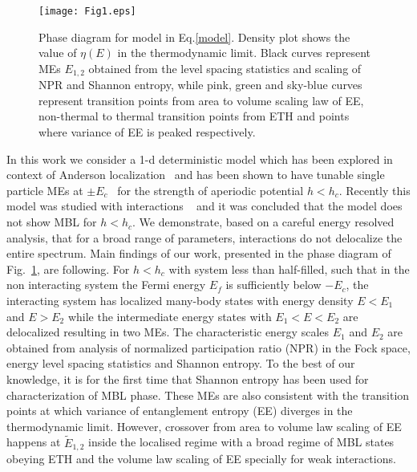 \documentclass[prl,aps,twocolumn,floats,nofootinbib,showpacs]{revtex4}
\begin{document}
\begin{figure}[h!]
\begin{center}
\vskip-0.35cm
\texttt{[image: Fig1.eps]}
\vskip-0.4cm
\caption{Phase diagram for model in Eq.\ref{model}. Density plot shows the value of $\eta(E)$ in the thermodynamic limit. Black curves represent MEs $E_{1,2}$ obtained from the level spacing statistics and scaling of NPR and Shannon entropy, while pink, green and sky-blue curves represent transition points from area to volume scaling law of EE, non-thermal to thermal transition points from ETH and points where variance of EE is peaked respectively.} 
\label{pd}
\end{center}
\end{figure}

In this work we consider a 1-d deterministic model which has been explored in context of Anderson localization~\cite{Fishman} and has been shown to have tunable single particle MEs at $\pm E_c$~\cite{Sarma1990} for the strength of aperiodic potential $h < h_c$. Recently this model was studied with interactions ~\cite{Subroto} and it was concluded that the model does not show MBL for $h < h_c$. We demonstrate, based on a careful energy resolved analysis, that for a broad range of parameters, interactions do not delocalize the entire spectrum. Main findings of our work, presented in the phase diagram of Fig.~\ref{pd}, are following. For $h<h_c$ with system less than half-filled, such that in the non interacting system the Fermi energy $E_f$ is sufficiently below $-E_c$, the interacting system has localized many-body states with energy density $E <E_1$ and $E > E_2$ while the intermediate energy states with $E_1<E<E_2$ are delocalized resulting in two MEs. The characteristic energy scales $E_1$ and $E_2$ are obtained from analysis of normalized participation ratio (NPR) in the Fock space, energy level spacing statistics and Shannon entropy. To the best of our knowledge, it is for the first time that Shannon entropy has been used for characterization of MBL phase. These MEs are also consistent with the transition points at which variance of entanglement entropy (EE) diverges in the thermodynamic limit. However, crossover from area to volume law scaling of EE happens at $\tilde{E}_{1,2}$ inside the localised regime with a broad regime of MBL states obeying ETH and the volume law scaling of EE specially for weak interactions.
\end{document}
